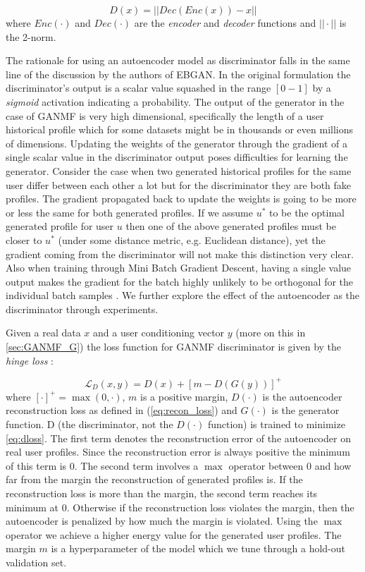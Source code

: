 \begin{equation}
    D(x) = ||Dec(Enc(x)) - x||
    \label{eq:recon_loss}
\end{equation}
where $Enc(\cdot)$ and $Dec(\cdot)$ are the \emph{encoder} and \emph{decoder} functions and $||\cdot||$ is the 2-norm.

The rationale for using an autoencoder model as discriminator falls in the same line of the discussion by the authors of EBGAN. In the original formulation the discriminator's output is a scalar value squashed in the range $[0-1]$ by a \emph{sigmoid} activation indicating a probability. The output of the generator in the case of GANMF is very high dimensional, specifically the length of a user historical profile which for some datasets might be in thousands or even millions of dimensions. Updating the weights of the generator through the gradient of a single scalar value in the discriminator output poses difficulties for learning the generator. Consider the case when two generated historical profiles for the same user differ between each other a lot but for the discriminator they are both fake profiles. The gradient propagated back to update the weights is going to be more or less the same for both generated profiles. If we assume $u^*$ to be the optimal generated profile for user $u$ then one of the above generated profiles must be closer to $u^*$ (under some distance metric, e.g. Euclidean distance), yet the gradient coming from the discriminator will not make this distinction very clear. Also when training through Mini Batch Gradient Descent, having a single value output makes the gradient for the batch highly unlikely to be orthogonal for the individual batch samples \cite{zhao2016energy}. We further explore the effect of the autoencoder as the discriminator through experiments.

Given a real data $x$ and a user conditioning vector $y$ (more on this in \ref{sec:GANMF_G}) the loss function for GANMF discriminator is given by the \emph{hinge loss} \cite{zhao2016energy}:

\begin{equation}
    \mathcal{L}_{D}(x, y) = D(x) + [m - D(G(y))]^+
    \label{eq:dloss}
\end{equation}
where $[\cdot]^+ = \max (0, \cdot)$, $m$ is a positive margin, $D(\cdot)$ is the autoencoder reconstruction loss as defined in (\ref{eq:recon_loss}) and $G(\cdot)$ is the generator function.
D (the discriminator, not the $D(\cdot)$ function) is trained to minimize \ref{eq:dloss}. The first term denotes the reconstruction error of the autoencoder on real user profiles. Since the reconstruction error is always positive the minimum of this term is 0. The second term involves a $\max$ operator between 0 and how far from the margin the reconstruction of generated profiles is. If the reconstruction loss is more than the margin, the second term reaches its minimum at 0. Otherwise if the reconstruction loss violates the margin, then the autoencoder is penalized by how much the margin is violated. Using the $\max$ operator we achieve a higher energy value for the generated user profiles. The margin $m$ is a hyperparameter of the model which we tune through a hold-out validation set.



